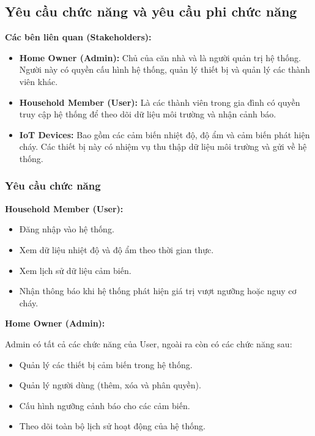 \documentclass[a4paper,twoside]{article}
\begin{document}
\subsection{Yêu cầu chức năng và yêu cầu phi chức năng}

\textbf{Các bên liên quan (Stakeholders):}

\begin{itemize}

\item \textbf{Home Owner (Admin):}  
Chủ của căn nhà và là người quản trị hệ thống.
Người này có quyền cấu hình hệ thống, quản lý thiết bị
và quản lý các thành viên khác.

\item \textbf{Household Member (User):}  
Là các thành viên trong gia đình có quyền truy cập
hệ thống để theo dõi dữ liệu môi trường và nhận cảnh báo.

\item \textbf{IoT Devices:}  
Bao gồm các cảm biến nhiệt độ, độ ẩm và cảm biến phát hiện cháy.
Các thiết bị này có nhiệm vụ thu thập dữ liệu môi trường
và gửi về hệ thống.

\end{itemize}

\subsubsection{Yêu cầu chức năng}

\textbf{Household Member (User):}

\begin{itemize}

\item Đăng nhập vào hệ thống.

\item Xem dữ liệu nhiệt độ và độ ẩm theo thời gian thực.

\item Xem lịch sử dữ liệu cảm biến.

\item Nhận thông báo khi hệ thống phát hiện giá trị
vượt ngưỡng hoặc nguy cơ cháy.

\end{itemize}

\textbf{Home Owner (Admin):}

Admin có tất cả các chức năng của User,
ngoài ra còn có các chức năng sau:

\begin{itemize}

\item Quản lý các thiết bị cảm biến trong hệ thống.

\item Quản lý người dùng (thêm, xóa và phân quyền).

\item Cấu hình ngưỡng cảnh báo cho các cảm biến.

\item Theo dõi toàn bộ lịch sử hoạt động của hệ thống.

\end{itemize}
\end{document}
